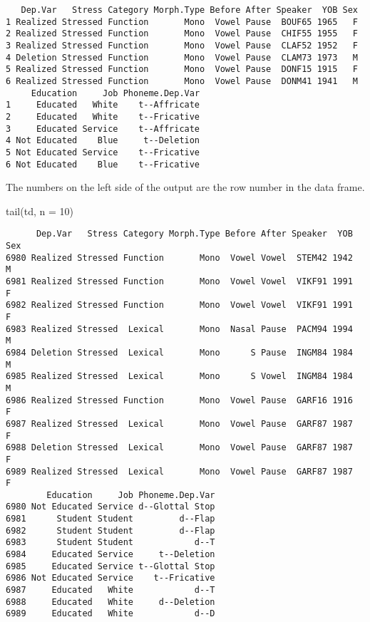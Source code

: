 \documentclass[
  10pt,
  letterpaper]{article}
\newenvironment{Shaded}{\begin{snugshade}}{\end{snugshade}}
\newcommand{\AttributeTok}[1]{\textcolor[rgb]{0.40,0.45,0.13}{#1}}
\newcommand{\DecValTok}[1]{\textcolor[rgb]{0.68,0.00,0.00}{#1}}
\newcommand{\FunctionTok}[1]{\textcolor[rgb]{0.28,0.35,0.67}{#1}}
\newcommand{\NormalTok}[1]{\textcolor[rgb]{0.00,0.23,0.31}{#1}}
\begin{document}
\begin{verbatim}
   Dep.Var   Stress Category Morph.Type Before After Speaker  YOB Sex
1 Realized Stressed Function       Mono  Vowel Pause  BOUF65 1965   F
2 Realized Stressed Function       Mono  Vowel Pause  CHIF55 1955   F
3 Realized Stressed Function       Mono  Vowel Pause  CLAF52 1952   F
4 Deletion Stressed Function       Mono  Vowel Pause  CLAM73 1973   M
5 Realized Stressed Function       Mono  Vowel Pause  DONF15 1915   F
6 Realized Stressed Function       Mono  Vowel Pause  DONM41 1941   M
     Education     Job Phoneme.Dep.Var
1     Educated   White    t--Affricate
2     Educated   White    t--Fricative
3     Educated Service    t--Affricate
4 Not Educated    Blue     t--Deletion
5 Not Educated Service    t--Fricative
6 Not Educated    Blue    t--Fricative
\end{verbatim}

The numbers on the left side of the output are the row number in the
data frame.

\begin{Shaded}
\begin{Highlighting}[]
\FunctionTok{tail}\NormalTok{(td, }\AttributeTok{n =} \DecValTok{10}\NormalTok{)}
\end{Highlighting}
\end{Shaded}

\begin{verbatim}
      Dep.Var   Stress Category Morph.Type Before After Speaker  YOB Sex
6980 Realized Stressed Function       Mono  Vowel Vowel  STEM42 1942   M
6981 Realized Stressed Function       Mono  Vowel Vowel  VIKF91 1991   F
6982 Realized Stressed Function       Mono  Vowel Vowel  VIKF91 1991   F
6983 Realized Stressed  Lexical       Mono  Nasal Pause  PACM94 1994   M
6984 Deletion Stressed  Lexical       Mono      S Pause  INGM84 1984   M
6985 Realized Stressed  Lexical       Mono      S Vowel  INGM84 1984   M
6986 Realized Stressed Function       Mono  Vowel Pause  GARF16 1916   F
6987 Realized Stressed  Lexical       Mono  Vowel Pause  GARF87 1987   F
6988 Deletion Stressed  Lexical       Mono  Vowel Pause  GARF87 1987   F
6989 Realized Stressed  Lexical       Mono  Vowel Pause  GARF87 1987   F
        Education     Job Phoneme.Dep.Var
6980 Not Educated Service d--Glottal Stop
6981      Student Student         d--Flap
6982      Student Student         d--Flap
6983      Student Student            d--T
6984     Educated Service     t--Deletion
6985     Educated Service t--Glottal Stop
6986 Not Educated Service    t--Fricative
6987     Educated   White            d--T
6988     Educated   White     d--Deletion
6989     Educated   White            d--D
\end{verbatim}
\end{document}
